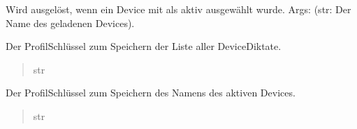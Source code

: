 \documentclass[letterpaper,10pt,english]{sphinxmanual}
\begin{document}
\begin{fulllineitems}
\begin{quote}
\begin{description}
\end{description}\end{quote}
\begin{description}
\begin{description}
\sphinxAtStartPar
Wird ausgelöst, wenn ein Device mit 
als aktiv ausgewählt wurde.
Args: (str: Der Name des geladenen Devices).

\end{description}

\end{description}

\begin{fulllineitems}
\label{\detokenize{modulab/device_manager:modules.device.DeviceManager.DeviceManager.KEY_DEVICE_LIST}}
\pysigstartsignatures
\pysigline
{}
\pysigstopsignatures
\sphinxAtStartPar
Der Profil\sphinxhyphen{}Schlüssel zum Speichern der Liste aller Device\sphinxhyphen{}Diktate.
\begin{quote}\begin{description}
\sphinxAtStartPar
str

\end{description}\end{quote}

\end{fulllineitems}


\begin{fulllineitems}
\label{\detokenize{modulab/device_manager:modules.device.DeviceManager.DeviceManager.KEY_ACTIVE_DEVICE}}
\pysigstartsignatures
\pysigline
{}
\pysigstopsignatures
\sphinxAtStartPar
Der Profil\sphinxhyphen{}Schlüssel zum Speichern des Namens des aktiven Devices.
\begin{quote}\begin{description}
\sphinxAtStartPar
str


\end{description}
\end{quote}
\end{fulllineitems}
\end{fulllineitems}
\end{document}
